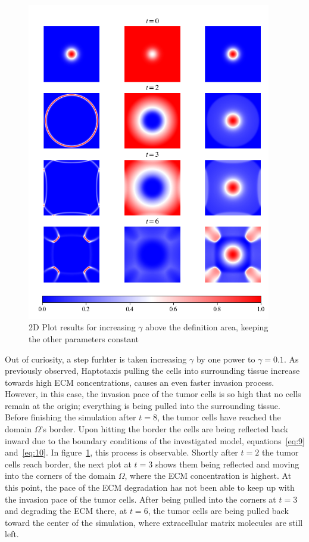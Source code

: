 \begin{figure}[h!]
 \centering
 \includegraphics[width=0.95\textwidth]{resources/images/gamma_2D_plot_.png}
 \caption{2D Plot results for increasing $\gamma$ above the definition area, keeping the other parameters constant}
 \label{fig:gamma_2D_plot}
\end{figure}
Out of curiosity, a step furhter is taken increasing $\gamma$ by one power to $\gamma=0.1$. As previously observed, Haptotaxis pulling the cells into surrounding tissue increase towards high ECM concentrations, causes an even faster invasion process. However, in this case, the invasion pace of the tumor cells is so high that no cells remain at the origin; everything is being pulled into the surrounding tissue. Before finishing the simulation after $t=8$, the tumor cells have reached the domain $\Omega$'s border. Upon hitting the border the cells are being reflected back inward due to the boundary conditions of the investigated model, equations~\ref{eq:9} and~\ref{eq:10}. In figure~\ref{fig:gamma_2D_plot}, this process is observable. Shortly after $t=2$ the tumor cells reach border, the next plot at $t=3$ shows them being reflected and moving into the corners of the domain $\Omega$, where the ECM concentration is highest. At this point, the pace of the ECM degradation has not been able to keep up with the invasion pace of the tumor cells. After being pulled into the corners at $t=3$ and degrading the ECM there, at $t=6$, the tumor cells are being pulled back toward the center of the simulation, where extracellular matrix molecules are still left.

